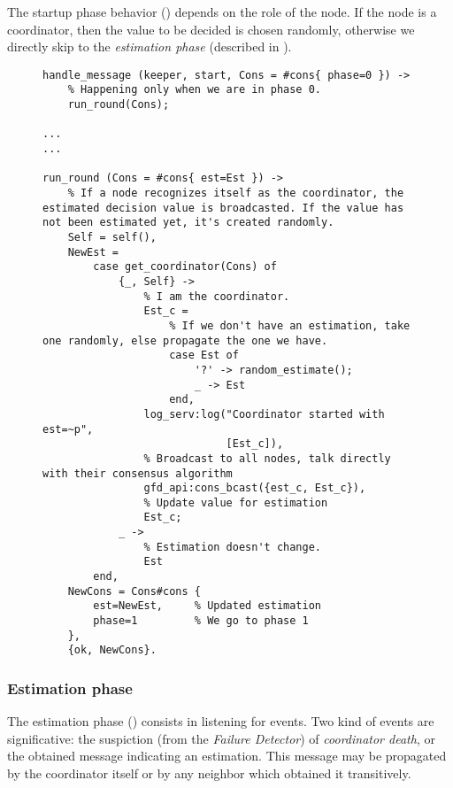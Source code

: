 The startup phase behavior () depends on the
role of the node. If the node is a coordinator, then the value to be
decided is chosen randomly, otherwise we directly skip to the
\emph{estimation phase} (described in ).

\begin{figure}[tb!]
\begin{lstlisting}[caption={Startup phase},
                   label={code:ConsStartup}]
handle_message (keeper, start, Cons = #cons{ phase=0 }) ->
    % Happening only when we are in phase 0.
    run_round(Cons);

...
...

run_round (Cons = #cons{ est=Est }) ->
    % If a node recognizes itself as the coordinator, the estimated decision value is broadcasted. If the value has not been estimated yet, it's created randomly.
    Self = self(),
    NewEst =
        case get_coordinator(Cons) of
            {_, Self} ->
                % I am the coordinator.
                Est_c =
                    % If we don't have an estimation, take one randomly, else propagate the one we have.
                    case Est of
                        '?' -> random_estimate();
                        _ -> Est
                    end,
                log_serv:log("Coordinator started with est=~p",
                             [Est_c]),
                % Broadcast to all nodes, talk directly with their consensus algorithm
                gfd_api:cons_bcast({est_c, Est_c}),
                % Update value for estimation
                Est_c;
            _ ->
                % Estimation doesn't change.
                Est
        end,
    NewCons = Cons#cons {
        est=NewEst,     % Updated estimation
        phase=1         % We go to phase 1
    },
    {ok, NewCons}.
\end{lstlisting}
\end{figure}

\subsubsection{Estimation phase} \label{subsub:ConsEstimation}

The estimation phase () consists in listening
for events. Two kind of events are significative: the suspiction (from the
\emph{Failure Detector}) of \emph{coordinator death}, or the obtained
message indicating an estimation. This message may be propagated by the
coordinator itself or by any neighbor which obtained it transitively.


